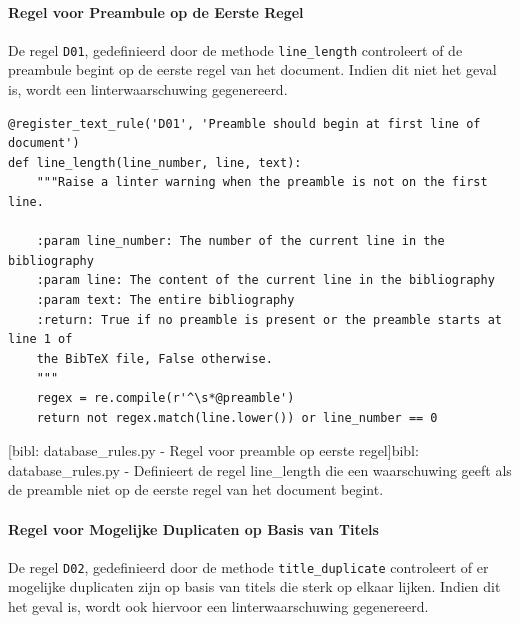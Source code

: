 \paragraph{Regel voor Preambule op de Eerste Regel}

De regel \texttt{D01}, gedefinieerd door de methode \texttt{line\_length} controleert of de preambule begint op de eerste regel van het document. Indien dit niet het geval is, wordt een linterwaarschuwing gegenereerd.

\begin{verbatim}
@register_text_rule('D01', 'Preamble should begin at first line of document')
def line_length(line_number, line, text):
    """Raise a linter warning when the preamble is not on the first line.

    :param line_number: The number of the current line in the bibliography
    :param line: The content of the current line in the bibliography
    :param text: The entire bibliography
    :return: True if no preamble is present or the preamble starts at line 1 of
    the BibTeX file, False otherwise.
    """
    regex = re.compile(r'^\s*@preamble')
    return not regex.match(line.lower()) or line_number == 0
\end{verbatim}
[bibl: database\_rules.py - Regel voor preamble op eerste regel]{bibl: database\_rules.py - Definieert de regel line\_length die een waarschuwing geeft als de preamble niet op de eerste regel van het document begint. \label{lst:bibl_rules_text_preamble}}

\paragraph{Regel voor Mogelijke Duplicaten op Basis van Titels}

De regel \texttt{D02}, gedefinieerd door de methode \texttt{title\_duplicate} controleert of er mogelijke duplicaten zijn op basis van titels die sterk op elkaar lijken. Indien dit het geval is, wordt ook hiervoor een linterwaarschuwing gegenereerd.

